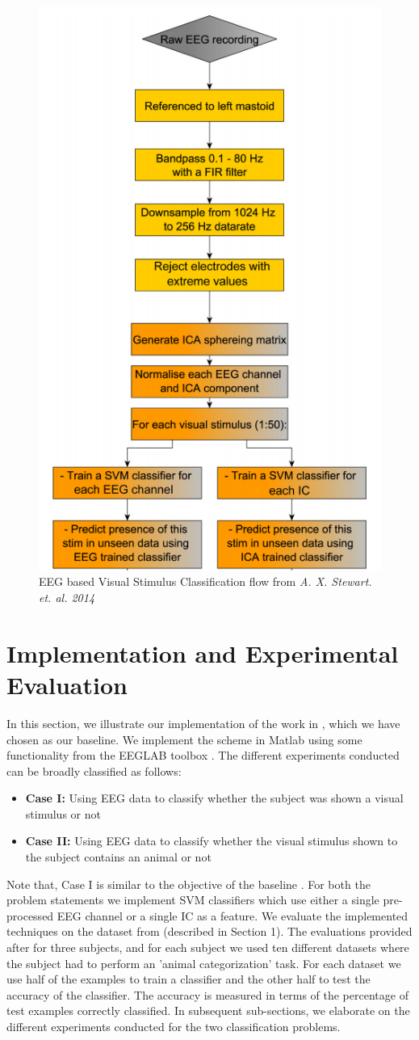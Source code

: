 \documentclass{article} %
\begin{document}
\begin{figure}
	\centering
	\includegraphics[width=0.5\columnwidth]{flowchart}
	\caption{EEG based Visual Stimulus Classification flow from \textit{A. X. Stewart. et. al. 2014}}
	\label{fig:flowchart}
\end{figure}

\section{Implementation and Experimental Evaluation}
In this section, we illustrate our implementation of the work in \cite{Stewart20141}, which we have chosen as our baseline. We implement the scheme in Matlab using some functionality from the EEGLAB toolbox \cite{eeglab}. The different experiments conducted can be broadly classified as follows:

\begin{itemize}
	\item \textbf{Case I:} Using EEG data to classify whether the subject was shown a visual stimulus or not 
	\item \textbf{Case II:} Using EEG data to classify whether the visual stimulus shown to the subject contains an animal or not 
\end{itemize}

Note that, Case I is similar to the objective of the baseline \cite{Stewart20141}. For both the problem statements we implement SVM classifiers which use either a single pre-processed EEG channel or a single IC as a feature. We evaluate the implemented techniques on the dataset from \cite{eeglab} (described in Section 1). The evaluations provided after for three subjects, and for each subject we used ten different datasets where the subject had to perform an 'animal categorization' task. For each dataset we use half of the examples to train a classifier and the other half to test the accuracy of the classifier. The accuracy is measured in terms of the percentage of test examples correctly classified. In subsequent sub-sections, we elaborate on the different experiments conducted for the two classification problems.
\end{document}
